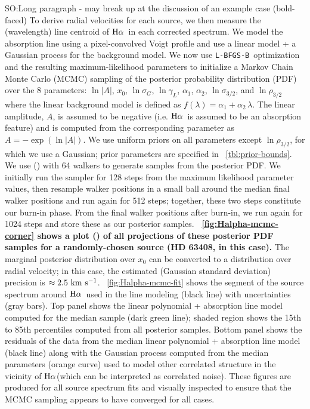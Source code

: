 \documentclass[modern, letterpaper]{aastex61}
\newcommand{\lbfgsb}{\texttt{L-BFGS-B}}
\newcommand{\Ha}{\ensuremath{{\rm H}\alpha}}
\newcommand{\smoh}[1]{\textcolor{mediumpersianblue}{SO:#1}}
\begin{document}
\smoh{Long paragraph - may break up at the discussion of an example case (bold-faced)}
To derive radial velocities for each source, we then measure the (wavelength)
line centroid of \Ha\ in each corrected spectrum.
We model the absorption line using a pixel-convolved Voigt profile and use a
linear model + a Gaussian process for the background model.
We now use \lbfgsb\ optimization and the resulting maximum-likelihood parameters
to initialize a Markov Chain Monte Carlo (MCMC) sampling of the posterior
probability distribution (PDF) over the 8 parameters: $\ln |A|$, $x_0$,
$\ln\sigma_G$, $\ln\gamma_L$, $\alpha_1$, $\alpha_2$, $\ln\sigma_{3/2}$, and
$\ln\rho_{3/2}$ where the linear background model is defined as $f(\lambda) =
\alpha_1 + \alpha_2\,\lambda$.
The linear amplitude, $A$, is assumed to be negative (i.e. \Ha\ is assumed to be
an absorption feature) and is computed from the corresponding parameter as $A =
-\exp(\ln |A|)$.
We use uniform priors on all parameters except $\ln\rho_{3/2}$, for which we use
a Gaussian; prior parameters are specified in \tablename~\ref{tbl:prior-bounds}.
We use  (\citealt{Foreman-Mackey:2013}) with 64 walkers to
generate samples from the posterior PDF.
We initially run the sampler for 128 steps from the maximum likelihood parameter
values, then resample walker positions in a small ball around the median final
walker positions and run again for 512 steps; together, these two steps
constitute our burn-in phase.
From the final walker positions after burn-in, we run again for 1024 steps and
store these as our posterior samples.
{\bf
\figurename~\ref{fig:Halpha-mcmc-corner} shows a  plot
(\citealt{Foreman-Mackey:2016}) of all projections of these posterior PDF
samples for a randomly-chosen source (HD 63408, in this case).}
The marginal posterior distribution over $x_0$ can be converted to a
distribution over radial velocity; in this case, the estimated (Gaussian
standard deviation) precision is $\approx 2.5~\mathrm{km}~\mathrm{s}^{-1}$.
\figurename~\ref{fig:Halpha-mcmc-fit} shows the segment of the source spectrum
around \Ha\ used in the line modeling (black line) with uncertainties (gray
bars).
Top panel shows the linear polynomial + absorption line model computed for the
median sample (dark green line); shaded region shows the 15th to 85th
percentiles computed from all posterior samples.
Bottom panel shows the residuals of the data from the median linear polynomial +
absorption line model (black line) along with the Gaussian process computed from
the median parameters (orange curve) used to model other correlated structure in
the vicinity of \Ha (which can be interpreted as correlated noise).
These figures are produced for all source spectrum fits and visually inspected
to ensure that the MCMC sampling appears to have converged for all cases.
\end{document}
